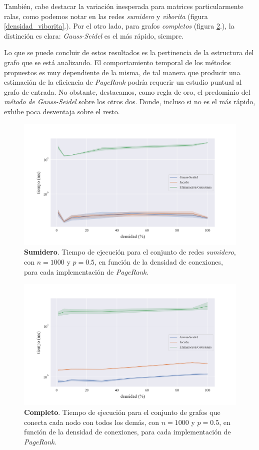 También, cabe destacar la variación inesperada para matrices particularmente ralas, como podemos notar en las redes \textit{sumidero} y \textit{viborita} (figura \ref{densidad_viborita}.).
Por el otro lado, para grafos \textit{completos} (figura \ref{densidad_todo_con_todo}.), la distinción es clara: \textit{Gauss-Seidel} es el más rápido, siempre.

\vspace{1em}
Lo que se puede concluir de estos resultados es la pertinencia de la estructura del grafo que se está analizando.
El comportamiento temporal de los métodos propuestos es muy dependiente de la misma, de tal manera que
producir una estimación de la eficiencia de \textit{PageRank} podría requerir un estudio puntual al grafo de entrada.
No obstante, destacamos, como regla de oro, el predominio del \textit{método de Gauss-Seidel} sobre los otros dos.
Donde, incluso si no es el más rápido, exhibe poca desventaja sobre el resto.


\begin{figure}[!htbp]
    \centering
    \includegraphics[width=.9\textwidth]{files/src/.media/densidad_red_sumidero.png}
    \caption{\textbf{Sumidero}. Tiempo de ejecución para el conjunto de redes \textit{sumidero}, con $n = 1000$ y $p = 0.5$, en función de la densidad de conexiones, para cada implementación de \textit{PageRank}.}
    \label{densidad_red_sumidero}
\end{figure}

\begin{figure}[!htbp]
    \centering
    \includegraphics[width=.9\textwidth]{files/src/.media/densidad_todo_con_todo.png}
    \caption{\textbf{Completo}. Tiempo de ejecución para el conjunto de grafos que conecta cada nodo con todos los demás, con $n = 1000$ y $p = 0.5$, en función de la densidad de conexiones, para cada implementación de \textit{PageRank}.}
    \label{densidad_todo_con_todo}
\end{figure}

